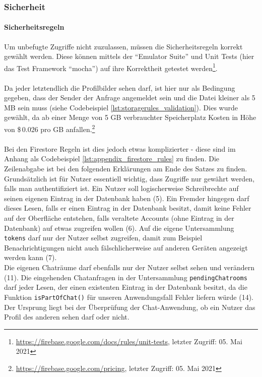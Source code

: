 \subsubsection{Sicherheit}
\label{sec:firebase_security}
\paragraph{Sicherheitsregeln}
Um unbefugte Zugriffe nicht zuzulassen, müssen die Sicherheitsregeln korrekt gewählt werden.
Diese können mittels der \enquote{Emulator Suite} und Unit Tests (hier das Test Framework \enquote{mocha}) auf ihre Korrektheit getestet werden\footnote{\url{https://firebase.google.com/docs/rules/unit-tests}, letzter Zugriff: 05. Mai 2021}.\\
\\
Da jeder letztendlich die Profilbilder sehen darf, ist hier nur als Bedingung gegeben, dass der Sender der Anfrage angemeldet sein und die Datei kleiner als 5 MB sein muss (siehe Codebeispiel \ref{lst:storagerules_validation}). 
Dies wurde gewählt, da ab einer Menge von 5 GB verbrauchter Speicherplatz Kosten in Höhe von \$\,0.026 pro GB anfallen.\footnote{\url{https://firebase.google.com/pricing}, letzter Zugriff: 05. Mai 2021}\\
\\
Bei den Firestore Regeln ist dies jedoch etwas komplizierter - diese sind im Anhang als Codebeispiel \ref{lst:appendix_firestore_rules} zu finden.
Die Zeilenabgabe ist bei den folgenden Erklärungen am Ende des Satzes zu finden.
Grundsätzlich ist für Nutzer essentiell wichtig, dass Zugriffe nur gewährt werden, falls man authentifiziert ist.
Ein Nutzer soll logischerweise Schreibrechte auf seinen eigenen Eintrag in der Datenbank haben (5).
Ein Fremder hingegen darf dieses Lesen, falls er einen Eintrag in der Datenbank besitzt, damit keine Fehler auf der Oberfläche entstehen, falls veraltete Accounts (ohne Eintrag in der Datenbank) auf etwas zugreifen wollen (6).
Auf die eigene Untersammlung \texttt{tokens} darf nur der Nutzer selbst zugreifen, damit zum Beispiel Benachrichtigungen nicht auch fälschlicherweise auf anderen Geräten angezeigt werden kann (7).\\
Die eigenen Chaträume darf ebenfalls nur der Nutzer selbst sehen und verändern (11).
Die eingehenden Chatanfragen in der Untersammlung \texttt{pendingChatrooms} darf jeder Lesen, der einen existenten Eintrag in der Datenbank besitzt, da die Funktion \texttt{isPartOfChat()} für unseren Anwendungsfall Fehler liefern würde (14).
Der Ursprung liegt bei der Überprüfung der Chat-Anwendung, ob ein Nutzer das Profil des anderen sehen darf oder nicht.
